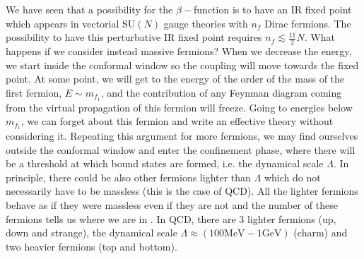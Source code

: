 \documentclass[../main.tex]{subfiles}
\begin{document}
We have seen that a possibility for the $\beta-$function is to have an IR fixed point which appears in vectorial SU$(N)$ gauge theories with $n_f$ Dirac fermions. The possibility to have this perturbative IR fixed point requires $n_f\lesssim\frac{11}{2}N$. What happens if we consider instead massive fermions? When we decrease the energy, we start inside the conformal window so the coupling will move towards the fixed point. 
At some point, we will get to the energy of the order of the mass of the first fermion, $E\sim m_{f_1}$, and the contribution of any Feynman diagram coming from the virtual propagation of this fermion will freeze. Going to energies below $m_{f_1}$, we can forget about this fermion and write an effective theory without considering it. Repeating this argument for more fermions, we may find ourselves outside the conformal window and enter the confinement phase, where there will be a threshold at which bound states are formed, i.e. the dynamical scale $\Lambda$. In principle, there could be also other fermions lighter than $\Lambda$ which do not necessarily have to be massless (this is the case of QCD). All the lighter fermions behave as if they were massless even if they are not and the number of these fermions tells us where we are in . In QCD, there are 3 lighter fermions (up, down and strange), the dynamical scale $\Lambda\approx(100\text{MeV}-1\text{GeV})$ (charm) and two heavier fermions (top and bottom).
\end{document}
